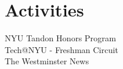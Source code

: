 \section{Activities}
NYU Tandon Honors Program\\
Tech@NYU - Freshman Circuit \\
The Westminster News \\
\sectionsep
